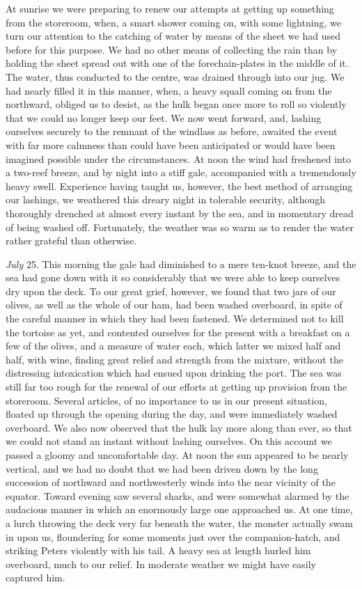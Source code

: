 At sunrise we were preparing to renew our attempts at getting up something
from the storeroom, when, a smart shower coming on, with some lightning, we turn
our attention to the catching of water by means of the sheet we had used before
for this purpose. We had no other means of collecting the rain than by holding
the sheet spread out with one of the forechain-plates in the middle of it. The
water, thus conducted to the centre, was drained through into our jug. We had
nearly filled it in this manner, when, a heavy squall coming on from the
northward, obliged us to desist, as the hulk began once more to roll so
violently that we could no longer keep our feet. We now went forward, and,
lashing ourselves securely to the remnant of the windlass as before, awaited the
event with far more calmness than could have been anticipated or would have been
imagined possible under the circumstances. At noon the wind had freshened into a
two-reef breeze, and by night into a stiff gale, accompanied with a tremendously
heavy swell. Experience having taught us, however, the best method of arranging
our lashings, we weathered this dreary night in tolerable security, although
thoroughly drenched at almost every instant by the sea, and in momentary dread
of being washed off. Fortunately, the weather was so warm as to render the water
rather grateful than otherwise. 

\emph{July} 25. This morning the gale had diminished to a mere ten-knot
breeze, and the sea had gone down with it so considerably that we were able to
keep ourselves dry upon the deck. To our great grief, however, we found that two
jars of our olives, as well as the whole of our ham, had been washed overboard,
in spite of the careful manner in which they had been fastened. We determined
not to kill the tortoise as yet, and contented ourselves for the present with a
breakfast on a few of the olives, and a measure of water each, which latter we
mixed half and half, with wine, finding great relief and strength from the
mixture, without the distressing intoxication which had ensued upon drinking the
port. The sea was still far too rough for the renewal of our efforts at getting
up provision from the storeroom. Several articles, of no importance to us in our
present situation, floated up through the opening during the day, and were
immediately washed overboard. We also now observed that the hulk lay more along
than ever, so that we could not stand an instant without lashing ourselves. On
this account we passed a gloomy and uncomfortable day. At noon the sun appeared
to be nearly vertical, and we had no doubt that we had been driven down by the
long succession of northward and northwesterly winds into the near vicinity of
the equator. Toward evening saw several sharks, and were somewhat alarmed by the
audacious manner in which an enormously large one approached us. At one time, a
lurch throwing the deck very far beneath the water, the monster actually swam in
upon us, floundering for some moments just over the companion-hatch, and
striking Peters violently with his tail. A heavy sea at length hurled him
overboard, much to our relief. In moderate weather we might have easily captured
him. 

